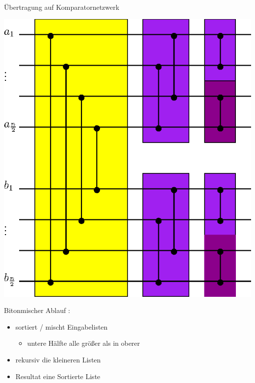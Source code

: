 \documentclass[ucs,9pt]{beamer}
\begin{document}
\begin{frame}{Übertragung auf Komparatornetzwerk}
\begin{center}
\includegraphics[scale=0.6]{bitonmischer.eps}
\end{center}
\end{frame}

\begin{frame}{Bitonmischer}
Ablauf :
\begin{itemize}
\item sortiert / mischt Eingabelisten
	\begin{itemize}
	\item untere Hälfte alle größer als in oberer
	\end{itemize}
\item rekursiv die kleineren Listen 
\item Resultat eine Sortierte Liste
\end{itemize}
\end{frame}
\end{document}
